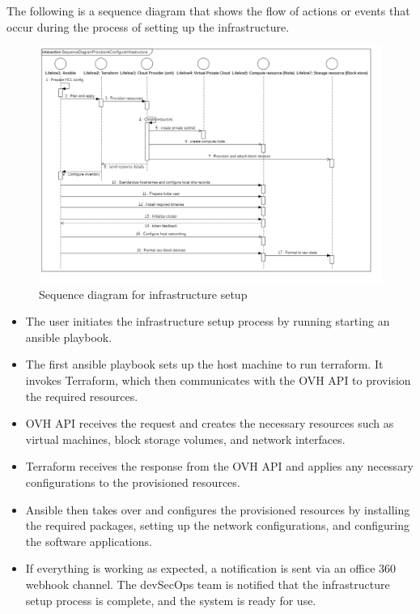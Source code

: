 The following is a sequence diagram that shows the flow of actions or events that occur during the process of setting up the infrastructure.


\begin{figure}[H]\centering
\includegraphics[width=1.0\textwidth,angle=00]{assets/f16.png}
\caption{Sequence diagram for infrastructure setup}
\label{fig:Sequence diagram for infrastructure setup}
\end{figure}

\begin{itemize}[label={--}]
    \item The user initiates the infrastructure setup process by running starting an ansible playbook.
    \item The first ansible playbook sets up the host machine to run terraform. It invokes Terraform, which then communicates with the OVH API to provision the required resources.
    \item OVH API receives the request and creates the necessary resources such as virtual machines, block storage volumes, and network interfaces.
    \item Terraform receives the response from the OVH API and applies any necessary configurations to the provisioned resources.
    \item Ansible then takes over and configures the provisioned resources by installing the required packages, setting up the network configurations, and configuring the software applications.
    \item If everything is working as expected, a notification is sent via an office 360 webhook channel. The devSecOps team is notified that the infrastructure setup process is complete, and the system is ready for use.
\end{itemize}

